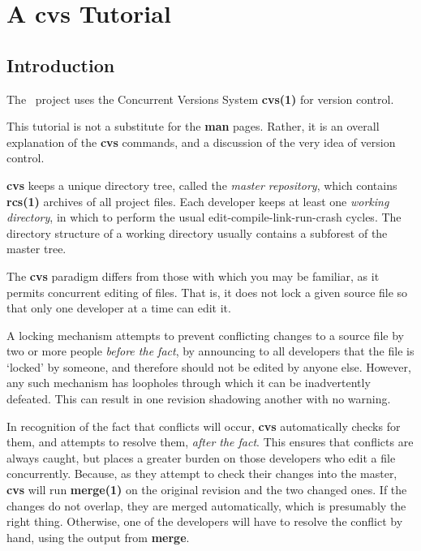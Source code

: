 

\section{A {\bf cvs} Tutorial}

\subsection{Introduction}


The \magnus\ project uses the Concurrent Versions System {\bf cvs(1)}
for version control.

This tutorial is not a substitute for the {\bf man} pages. Rather, it
is an overall explanation of the {\bf cvs} commands, and a discussion
of the very idea of version control.

{\bf cvs} keeps a unique directory tree, called the {\em master
repository}, which contains {\bf rcs(1)} archives of all project
files. Each developer keeps at least one {\em working directory}, in
which to perform the usual edit-compile-link-run-crash cycles. The
directory structure of a working directory usually contains a
subforest of the master tree.

The {\bf cvs} paradigm differs from those with which you may be
familiar, as it permits concurrent editing of files. That is, it does
not lock a given source file so that only one developer at a time can
edit it.

A locking mechanism attempts to prevent conflicting changes to a
source file by two or more people {\em before the fact}, by announcing
to all developers that the file is `locked' by someone, and therefore
should not be edited by anyone else.  However, any such mechanism has
loopholes through which it can be inadvertently defeated. This can
result in one revision shadowing another with no warning.

In recognition of the fact that conflicts will occur, {\bf cvs}
automatically checks for them, and attempts to resolve them, {\em
after the fact}. This ensures that conflicts are always caught, but
places a greater burden on those developers who edit a file
concurrently. Because, as they attempt to check their changes into the
master, {\bf cvs} will run {\bf merge(1)} on the original revision and
the two changed ones. If the changes do not overlap, they are merged
automatically, which is presumably the right thing.  Otherwise, one of
the developers will have to resolve the conflict by hand, using the
output from {\bf merge}.


